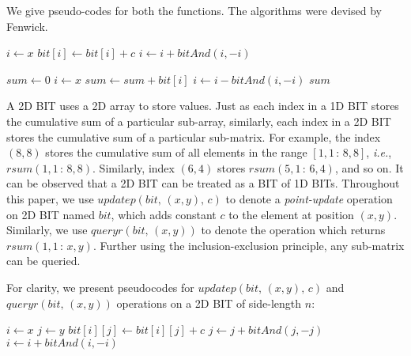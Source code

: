 \documentclass[a4paper]{article}
\begin{document}
\vspace{2 mm}
We give pseudo-codes for both the functions. The algorithms were devised by Fenwick\cite{BIT}.

\vspace {3 mm}
\noindent
{}
\begin{algorithmic}[1]

        \State $i \gets x$
            \State $bit[i] \gets bit[i] + c$
            \State $i \gets i + bitAnd(i, -i)$
        \EndWhile
\EndFunction
\end{algorithmic}

\vspace {3 mm}
\noindent
{}
\begin{algorithmic}[1]

        \State $sum \gets 0$
        \State $i \gets x$
            \State $sum \gets sum + bit[i]$
            \State $i \gets i - bitAnd(i, -i)$
        \EndWhile
        \State \Return $sum$
\EndFunction
\end{algorithmic}

\vspace{3 mm}
A 2D BIT uses a 2D array to store values. Just as each index in a 1D BIT stores the cumulative sum of a particular sub-array, similarly, each index in a 2D BIT stores the cumulative sum of a particular sub-matrix. For example, the index $(8, 8)$ stores the cumulative sum of all elements in the range $[1, 1\, :\, 8, 8]$, \textit{i.e.}, $rsum(1, 1\, :\, 8, 8)$. Similarly, index $(6, 4)$ stores $rsum(5, 1\, :\, 6, 4)$, and so on. It can be observed that a 2D BIT can be treated as a BIT of 1D BITs. Throughout this paper, we use $updatep(bit,\, (x, y),\, c)$ to denote a \textit{point-update} operation on 2D BIT named $bit$, which adds constant $c$ to the element at position $(x, y)$. Similarly, we use $queryr(bit,\, (x, y))$ to denote the operation which returns $rsum(1, 1\, : \,x, y)$. Further using the inclusion-exclusion principle, any sub-matrix can be queried.

\vspace{2 mm}
For clarity, we present pseudocodes for $updatep(bit,\, (x, y),\, c)$ and $queryr(bit,\, (x, y) )$ operations on a 2D BIT of side-length $n$:

\vspace {3 mm}
\noindent
{}
\begin{algorithmic}[1]

        \State $i \gets x$
            \State $j \gets y$
                \State $bit[i][j] \gets bit[i][j] + c$
                \State $j \gets j + bitAnd(j, -j)$
            \EndWhile
            \State $i \gets i + bitAnd(i, -i)$
        \EndWhile
\EndFunction
\end{algorithmic}
\end{document}
